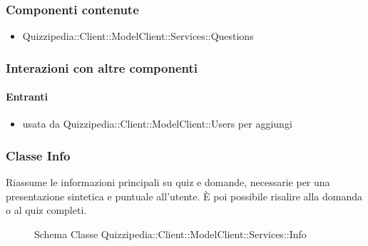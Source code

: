 \subsubsection{Componenti contenute}
\begin{itemize}
\item Quizzipedia::Client::ModelClient::Services::Questions
\end{itemize}
\subsubsection{Interazioni con altre componenti}
\paragraph{Entranti}
\begin{itemize}
\item usata da Quizzipedia::Client::ModelClient::Users per aggiungi
\end{itemize}
\subsubsection{Classe Info}
Riassume le informazioni principali su quiz e domande, necessarie per una presentazione sintetica e puntuale all'utente. È poi possibile risalire alla domanda o al quiz completi.
\begin{figure}[H]
\centering
\noindent{}
\caption[Schema Classe Info]{Schema Classe Quizzipedia::Client::ModelClient::Services::Info}
\end{figure}
